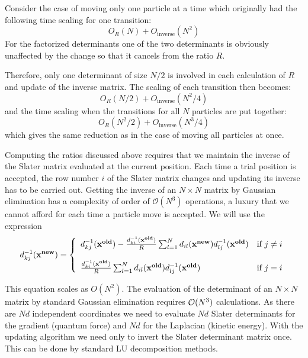 \documentclass[graybox,sectrefs,envcountresetchap,open=right]{svmonodo}
\begin{document}
Consider the case of moving only one particle  at a time which
originally had the following time scaling for one transition:
\[
O_R(N)+O_\mathrm{inverse}(N^2)
\]
For the factorized determinants one of the two determinants is
obviously unaffected by the change so that it cancels from the ratio
$R$. 






Therefore, only one determinant of size $N/2$ is involved in each
calculation of $R$ and update of the inverse matrix. The scaling of
each transition then becomes:
\[
O_R(N/2)+O_\mathrm{inverse}(N^2/4)
\]
and the time scaling when the transitions for all $N$ particles are
put together:
\[
O_R(N^2/2)+O_\mathrm{inverse}(N^3/4)
\]
which gives the same reduction as in the case of moving all particles
at once.





Computing the ratios discussed above requires that we maintain 
the inverse of the Slater matrix evaluated at the current position. 
Each time a trial position is accepted, the row number $i$ of the Slater 
matrix changes and updating its inverse has to be carried out. 
Getting the inverse of an $N \times N$ matrix by Gaussian elimination has a 
complexity of order of $\mathcal{O}(N^3)$ operations, a luxury that we 
cannot afford for each time a particle  move is accepted.
We will use the expression
\begin{equation}
\label{updatingInverse}
d^{-1}_{kj}(\mathbf{x^{new}}) = \left\{\begin{array}{l l}
  d^{-1}_{kj}(\mathbf{x^{old}}) - \frac{d^{-1}_{ki}(\mathbf{x^{old}})}{R} \sum_{l=1}^{N} d_{il}(\mathbf{x^{new}})  d^{-1}_{lj}(\mathbf{x^{old}}) & \mbox{if $j \neq i$}\nonumber \\ \\
 \frac{d^{-1}_{ki}(\mathbf{x^{old}})}{R} \sum_{l=1}^{N} d_{il}(\mathbf{x^{old}}) d^{-1}_{lj}(\mathbf{x^{old}}) & \mbox{if $j=i$}
\end{array} \right.
\end{equation}





This equation scales as $O(N^2)$.
The evaluation of the determinant of an $N \times N$ matrix by standard Gaussian elimination 
requires ${\cal O}(N^3)$
calculations. 
As there are $Nd$ independent coordinates we need to evaluate $Nd$ Slater determinants 
for the gradient (quantum force) and $Nd$ for the Laplacian (kinetic energy). 
With the updating algorithm we need only to invert the Slater 
determinant matrix once. This can be done by standard LU decomposition methods.
\end{document}
